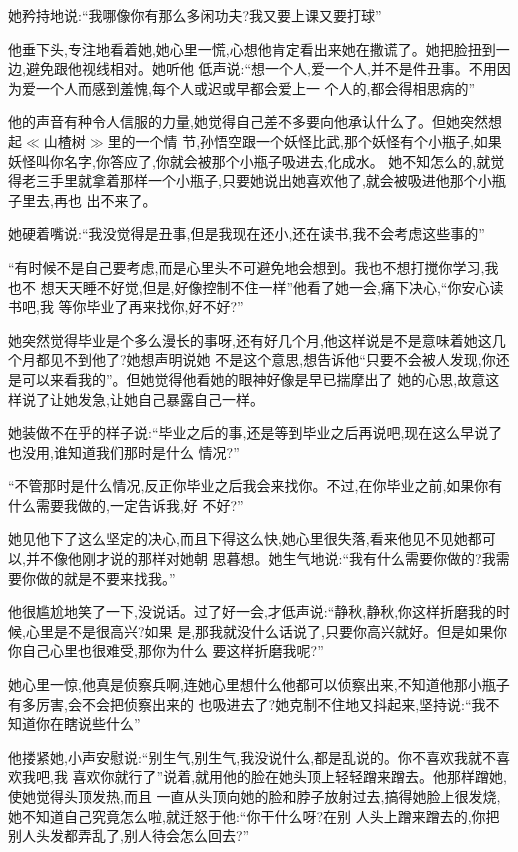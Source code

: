 ﻿\documentclass[12pt]{article}
\begin{document}
她矜持地说:``我哪像你有那么多闲功夫?我又要上课又要打球\myrule ''

他垂下头,专注地看着她,她心里一慌,心想他肯定看出来她在撒谎了。她把脸扭到一边,避免跟他视线相对。她听他
低声说:``想一个人,爱一个人,并不是件丑事。不用因为爱一个人而感到羞愧,每个人或迟或早都会\myrule 爱上一
个人的,都会得相思病的\myrule ''

他的声音有种令人信服的力量,她觉得自己差不多要向他承认什么了。但她突然想起$\ll$山楂树$\gg$里的一个情
节,孙悟空跟一个妖怪比武,那个妖怪有个小瓶子,如果妖怪叫你名字,你答应了,你就会被那个小瓶子吸进去,化成水。
她不知怎么的,就觉得老三手里就拿着那样一个小瓶子,只要她说出她喜欢他了,就会被吸进他那个小瓶子里去,再也
出不来了。

她硬着嘴说:``我没觉得\myrule 是丑事,但是我现在还\myrule 小,还在读书,我不会考虑这些事的\myrule ''

``有时候不是自己要考虑,而是\myrule 心里头\myrule 不可避免地会\myrule 想到。我也不想打搅你学习,我也不
想天天睡不好觉,但是\myrule ,好像控制不住一样\myrule ''他看了她一会,痛下决心,``你安心读书吧,我\myrule 
等你\myrule 毕业了再来找你,好不好?''

她突然觉得毕业是个多么漫长的事呀,还有好几个月,他这样说是不是意味着她这几个月都见不到他了?她想声明说她
不是这个意思,想告诉他``只要不会被人发现,你还是可以来看我的''。但她觉得他看她的眼神好像是早已揣摩出了
她的心思,故意这样说了让她发急,让她自己暴露自己一样。

她装做不在乎的样子说:``毕业之后的事,还是等到毕业之后再说吧,现在这么早说了也没用,谁知道我们那时是什么
情况?''

``不管那时是什么情况,反正你毕业之后我会来找你。不过,在你毕业之前,如果你有什么需要我做的,一定告诉我,好
不好?''

她见他下了这么坚定的决心,而且下得这么快,她心里很失落,看来他见不见她都可以,并不像他刚才说的那样对她朝
思暮想。她生气地说:``我有什么需要你做的?我需要你做的就是不要来找我。''

他很尴尬地笑了一下,没说话。过了好一会,才低声说:``静秋,静秋,你这样折磨我的时候,心里是不是很高兴?如果
是,那我就没什么话说了,只要你高兴就好。但是如果你\myrule 你自己心里也很\myrule 难受,那你\myrule 为什么
要\myrule 这样折磨我呢?''

她心里一惊,他真是侦察兵啊,连她心里想什么他都可以侦察出来,不知道他那小瓶子有多厉害,会不会把侦察出来的
也吸进去了?她克制不住地又抖起来,坚持说:``我\myrule 不知道你在\myrule 瞎说些什么\myrule ''

他搂紧她,小声安慰说:``别生气,别生气,我没说什么,都是\myrule 乱说的。你不喜欢我\myrule 就不喜欢我吧,我
\myrule 喜欢你就行了\myrule ''说着,就用他的脸在她头顶上轻轻蹭来蹭去。他那样蹭她,使她觉得头顶发热,而且
一直从头顶向她的脸和脖子放射过去,搞得她脸上很发烧,她不知道自己究竟怎么啦,就迁怒于他:``你干什么呀?在别
人头上蹭来蹭去的\myrule ,你把别人头发都弄乱了,别人待会怎么回去?''
\end{document}
